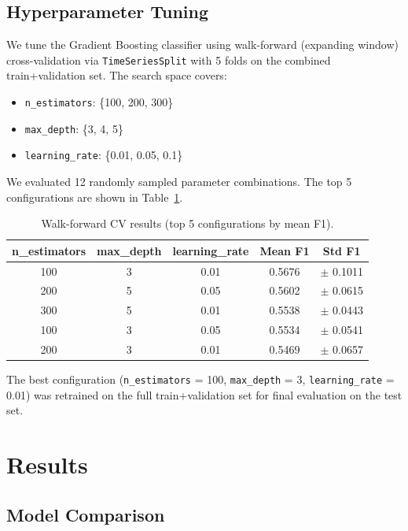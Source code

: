 \documentclass[11pt]{article}
\begin{document}
\subsection{Hyperparameter Tuning}

We tune the Gradient Boosting classifier using walk-forward (expanding window) cross-validation via \texttt{TimeSeriesSplit} with 5 folds on the combined train+validation set. The search space covers:
\begin{itemize}
    \item \texttt{n\_estimators}: \{100, 200, 300\}
    \item \texttt{max\_depth}: \{3, 4, 5\}
    \item \texttt{learning\_rate}: \{0.01, 0.05, 0.1\}
\end{itemize}

We evaluated 12 randomly sampled parameter combinations. The top 5 configurations are shown in Table~\ref{tab:cv}.

\begin{table}[H]
\centering
\caption{Walk-forward CV results (top 5 configurations by mean F1).}
\label{tab:cv}
\begin{tabular}{ccccc}
\toprule
\textbf{n\_estimators} & \textbf{max\_depth} & \textbf{learning\_rate} & \textbf{Mean F1} & \textbf{Std F1} \\
\midrule
100 & 3 & 0.01 & 0.5676 & $\pm$ 0.1011 \\
200 & 5 & 0.05 & 0.5602 & $\pm$ 0.0615 \\
300 & 5 & 0.01 & 0.5538 & $\pm$ 0.0443 \\
100 & 3 & 0.05 & 0.5534 & $\pm$ 0.0541 \\
200 & 3 & 0.01 & 0.5469 & $\pm$ 0.0657 \\
\bottomrule
\end{tabular}
\end{table}

The best configuration (\texttt{n\_estimators} = 100, \texttt{max\_depth} = 3, \texttt{learning\_rate} = 0.01) was retrained on the full train+validation set for final evaluation on the test set.

\section{Results}
\label{sec:results}

\subsection{Model Comparison}
\end{document}
